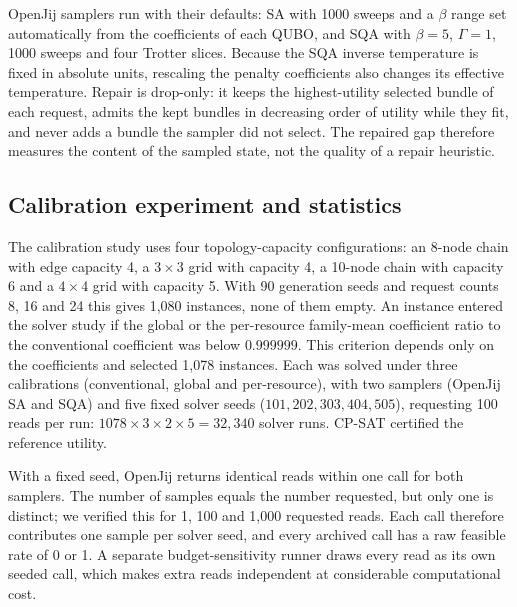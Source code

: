 \documentclass[pdflatex,sn-nature]{sn-jnl}
\theoremstyle{plain}
\theoremstyle{remark}
\begin{document}
OpenJij samplers run with their defaults: SA with 1000 sweeps and a $\beta$ range set automatically from the coefficients of each QUBO, and SQA with $\beta=5$, $\Gamma=1$, 1000 sweeps and four Trotter slices. Because the SQA inverse temperature is fixed in absolute units, rescaling the penalty coefficients also changes its effective temperature. Repair is drop-only: it keeps the highest-utility selected bundle of each request, admits the kept bundles in decreasing order of utility while they fit, and never adds a bundle the sampler did not select. The repaired gap therefore measures the content of the sampled state, not the quality of a repair heuristic.

\subsection{Calibration experiment and statistics}

The calibration study uses four topology-capacity configurations: an 8-node chain with edge capacity 4, a $3\times3$ grid with capacity 4, a 10-node chain with capacity 6 and a $4\times4$ grid with capacity 5. With 90 generation seeds and request counts 8, 16 and 24 this gives 1,080 instances, none of them empty. An instance entered the solver study if the global or the per-resource family-mean coefficient ratio to the conventional coefficient was below $0.999999$. This criterion depends only on the coefficients and selected 1,078 instances. Each was solved under three calibrations (conventional, global and per-resource), with two samplers (OpenJij SA and SQA) and five fixed solver seeds ($101,202,303,404,505$), requesting 100 reads per run: $1078\times3\times2\times5=32{,}340$ solver runs. CP-SAT certified the reference utility.

With a fixed seed, OpenJij returns identical reads within one call for both samplers. The number of samples equals the number requested, but only one is distinct; we verified this for 1, 100 and 1,000 requested reads. Each call therefore contributes one sample per solver seed, and every archived call has a raw feasible rate of 0 or 1. A separate budget-sensitivity runner draws every read as its own seeded call, which makes extra reads independent at considerable computational cost.
\end{document}

